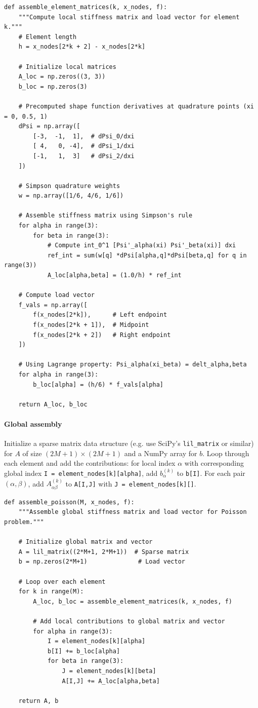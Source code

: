 \documentclass[a4paper,10pt]{report}
\begin{document}
\begin{verbatim}
def assemble_element_matrices(k, x_nodes, f):
	"""Compute local stiffness matrix and load vector for element k."""
	# Element length
	h = x_nodes[2*k + 2] - x_nodes[2*k]
	
	# Initialize local matrices
	A_loc = np.zeros((3, 3))
	b_loc = np.zeros(3)
	
	# Precomputed shape function derivatives at quadrature points (xi = 0, 0.5, 1)
	dPsi = np.array([
		[-3,  -1,  1],  # dPsi_0/dxi
		[ 4,   0, -4],  # dPsi_1/dxi
		[-1,   1,  3]   # dPsi_2/dxi
	])
	
	# Simpson quadrature weights
	w = np.array([1/6, 4/6, 1/6])
	
	# Assemble stiffness matrix using Simpson's rule
	for alpha in range(3):
		for beta in range(3):
			# Compute int_0^1 [Psi'_alpha(xi) Psi'_beta(xi)] dxi
			ref_int = sum(w[q] *dPsi[alpha,q]*dPsi[beta,q] for q in range(3))
			A_loc[alpha,beta] = (1.0/h) * ref_int
	
	# Compute load vector
	f_vals = np.array([
		f(x_nodes[2*k]),      # Left endpoint
		f(x_nodes[2*k + 1]),  # Midpoint
		f(x_nodes[2*k + 2])   # Right endpoint
	])
	
	# Using Lagrange property: Psi_alpha(xi_beta) = delt_alpha,beta
	for alpha in range(3):
		b_loc[alpha] = (h/6) * f_vals[alpha]
	
	return A_loc, b_loc
\end{verbatim}

\paragraph{Global assembly}
Initialize a sparse matrix data structure (e.g. use SciPy's \texttt{lil_matrix} or similar) for \(A\) of size \((2M+1)\times(2M+1)\) and a NumPy array for \(b\).
Loop through each element and add the contributions: for local index \(\alpha\) with corresponding global index \texttt{I = element_nodes[k][alpha]}, add \(b^{(k)}_\alpha\) to \texttt{b[I]}.
For each pair \((\alpha,\beta)\), add \(A^{(k)}_{\alpha\beta}\) to \texttt{A[I,J]} with \texttt{J = element_nodes[k][\beta]}.
\begin{verbatim}
def assemble_poisson(M, x_nodes, f):
	"""Assemble global stiffness matrix and load vector for Poisson problem."""
	
	# Initialize global matrix and vector
	A = lil_matrix((2*M+1, 2*M+1))  # Sparse matrix
	b = np.zeros(2*M+1)              # Load vector
	
	# Loop over each element
	for k in range(M):
		A_loc, b_loc = assemble_element_matrices(k, x_nodes, f)
		
		# Add local contributions to global matrix and vector
		for alpha in range(3):
			I = element_nodes[k][alpha]
			b[I] += b_loc[alpha]
			for beta in range(3):
				J = element_nodes[k][beta]
				A[I,J] += A_loc[alpha,beta]
	
	return A, b
\end{verbatim}
\end{document}
